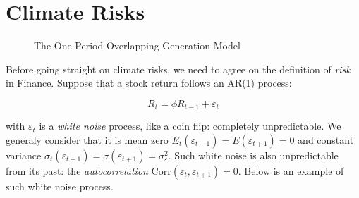 \chapter{Climate Risks}

\begin{figure}[htbp]
    \centering
    \caption{The One-Period Overlapping Generation Model}
    \label{fig:fig01}
\end{figure}

Before going straight 
on climate risks, we need to agree on 
the definition of \textit{risk} in Finance. Suppose 
that a stock return follows an AR(1) process:

\begin{equation}
    R_{t} = \phi R_ {t-1} + \varepsilon_{t}
\end{equation}

with $\varepsilon_{t}$ is a \textit{white noise} process,
like a coin flip: completely unpredictable.
We generaly consider 
that it is 
mean zero $E_t(\varepsilon_{t+1}) = E(\varepsilon_{t+1}) = 0$
and constant variance $\sigma_t(\varepsilon_{t+1}) = \sigma(\varepsilon_{t+1})= \sigma_{\varepsilon}^2$.
Such white noise is also unpredictable from its past:
the \textit{autocorrelation} $\text{Corr}(\varepsilon_{t},\varepsilon_{t+1})=0$.
Below is an example of such white noise process.

